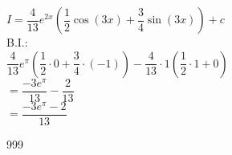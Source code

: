 \documentclass[a4paper]{article}
\begin{document}
$I = \dfrac{4}{13} e^{2x}\left(\dfrac{1}{2}\cos(3x) + \dfrac{3}{4}\sin(3x)\right)+c$\\

B.I.:\\

$\dfrac{4}{13}e^\pi\left(\dfrac{1}{2}\cdot 0 + \dfrac{3}{4} \cdot (-1)\right) - \dfrac{4}{13} \cdot 1 \left(\dfrac{1}{2} \cdot 1 + 0\right)$\\

$ = \dfrac{-3e^\pi}{13} - \dfrac{2}{13}$\\

$ = \dfrac{-3e^\pi - 2}{13}$

\normalsize



\begin{thebibliography}{999}
\end{thebibliography}
\end{document}
